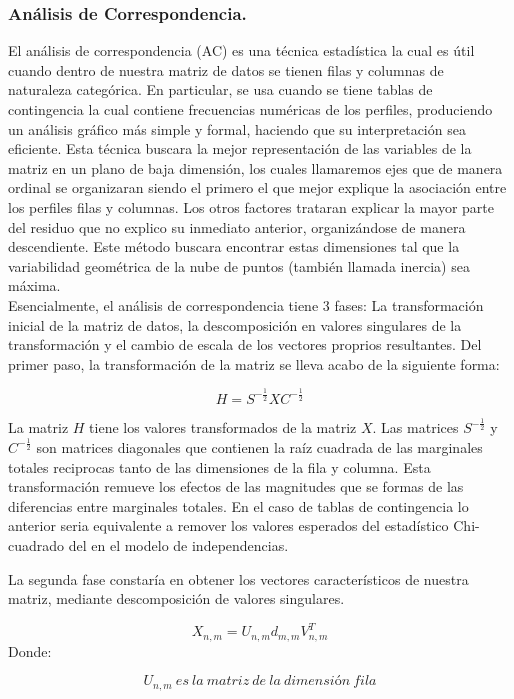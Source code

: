 \hypertarget{anuxe1lisis-de-correspondencia.}{%
\subsubsection{Análisis de
Correspondencia.}\label{anuxe1lisis-de-correspondencia.}}

El análisis de correspondencia (AC) es una técnica estadística la cual
es útil cuando dentro de nuestra matriz de datos se tienen filas y
columnas de naturaleza categórica. En particular, se usa cuando se tiene
tablas de contingencia la cual contiene frecuencias numéricas de los
perfiles, produciendo un análisis gráfico más simple y formal, haciendo
que su interpretación sea eficiente. Esta técnica buscara la mejor
representación de las variables de la matriz en un plano de baja
dimensión, los cuales llamaremos ejes que de manera ordinal se
organizaran siendo el primero el que mejor explique la asociación entre
los perfiles filas y columnas. Los otros factores trataran explicar la
mayor parte del residuo que no explico su inmediato anterior,
organizándose de manera descendiente. Este método buscara encontrar
estas dimensiones tal que la variabilidad geométrica de la nube de
puntos (también llamada inercia) sea máxima.\\
Esencialmente, el análisis de correspondencia tiene 3 fases: La
transformación inicial de la matriz de datos, la descomposición en
valores singulares de la transformación y el cambio de escala de los
vectores proprios resultantes. Del primer paso, la transformación de la
matriz se lleva acabo de la siguiente forma:

\[ H=S^{-\frac{1}{2}}XC^{-\frac{1}{2}} \]

La matriz \(H\) tiene los valores transformados de la matriz \(X\). Las
matrices \(S^{-\frac{1}{2}}\) y \(C^{-\frac{1}{2}}\) son matrices
diagonales que contienen la raíz cuadrada de las marginales totales
reciprocas tanto de las dimensiones de la fila y columna. Esta
transformación remueve los efectos de las magnitudes que se formas de
las diferencias entre marginales totales. En el caso de tablas de
contingencia lo anterior seria equivalente a remover los valores
esperados del estadístico Chi-cuadrado del en el modelo de
independencias.

La segunda fase constaría en obtener los vectores característicos de
nuestra matriz, mediante descomposición de valores singulares.

\[ X_{n,m}= U_{n,m}d_{m,m}V^{T}_{n,m} \] Donde:

\[ U_{n,m} \ es \ la \ matriz \ de \ la \ dimensión \ fila \]


